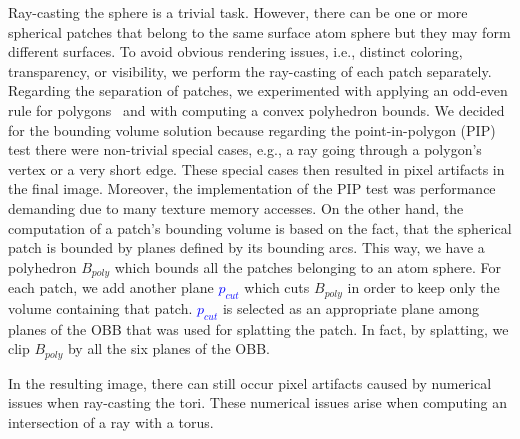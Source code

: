 Ray-casting the sphere is a trivial task. 
However, there can be one or more spherical patches that belong to the same surface atom sphere but they may form different surfaces.
To avoid obvious rendering issues, i.e., distinct coloring, transparency, or visibility, we perform the ray-casting of each patch separately.
Regarding the separation of patches, we experimented with applying an odd-even rule for polygons~\cite{shimrat1962algorithm} and with computing a convex polyhedron bounds.
We decided for the bounding volume solution because regarding the point-in-polygon (PIP) test there were non-trivial special cases, e.g., a ray going through a polygon's vertex or a very short edge.
These special cases then resulted in pixel artifacts in the final image.
Moreover, the implementation of the PIP test was performance demanding due to many texture memory accesses.
On the other hand, the computation of a patch's bounding volume is based on the fact, that the spherical patch is bounded by planes defined by its bounding arcs.
This way, we have a polyhedron $B_{poly}$ which bounds all the patches belonging to an atom sphere.
For each patch, we add another plane \textcolor{blue}{$p_{cut}$} which cuts $B_{poly}$ in order to keep only the volume containing that patch.
\textcolor{blue}{$p_{cut}$} is selected as an appropriate plane among planes of the OBB that was used for splatting the patch.
In fact, by splatting, we clip $B_{poly}$ by all the six planes of the OBB.

In the resulting image, there can still occur pixel artifacts caused by numerical issues when ray-casting the tori.
These numerical issues arise when computing an intersection of a ray with a torus.

